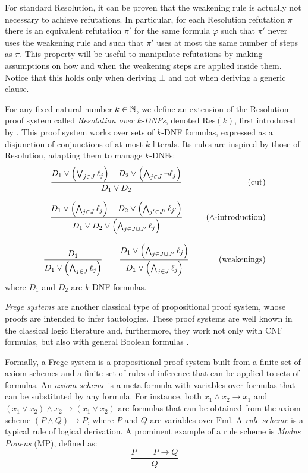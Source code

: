 For standard Resolution, it can be proven that the weakening rule is actually not necessary to achieve refutations. In particular, for each Resolution refutation $\pi$ there is an equivalent refutation $\pi'$ for the same formula $\varphi$ such that $\pi'$ never uses the weakening rule and such that $\pi'$ uses at most the same number of steps as $\pi$. This property will be useful to manipulate refutations by making assumptions on how and when the weakening steps are applied inside them. Notice that this holds only when deriving $\bot$ and not when deriving a generic clause.

For any fixed natural number $k \in \mathbb{N}$, we define an extension of the Resolution proof system called \textit{Resolution over $k$-DNFs}, denoted $\mathrm{Res}(k)$, first introduced by \textcite{resk}. This proof system works over sets of $k$-DNF formulas, expressed as a disjunction of conjunctions of at most $k$ literals. Its rules are inspired by those of Resolution, adapting them to manage $k$-DNFs:
\[\begin{array}{cr}
\dfrac{D_1 \lor \left ( \bigvee_{j \in J} \ell_j \right ) \quad D_2 \lor \left ( \bigwedge_{j \in J} \lnot \ell_j \right )}{D_1 \lor D_2} & \quad \text{(cut)} \\\\

\dfrac{D_1 \lor \left ( \bigwedge_{j \in J} \ell_j \right ) \quad D_2 \lor \left ( \bigwedge_{j' \in J'} \ell_{j'} \right )}{D_1 \lor D_2 \lor \left ( \bigwedge_{j \in J \cup J'} \ell_j \right )} &\quad \text{($\land$-introduction)} \\\\

\dfrac{D_1}{D_1 \lor \left ( \bigwedge_{j \in J} \ell_j \right )} \qquad \dfrac{D_1 \lor \left ( \bigwedge_{j \in J \cup J'} \ell_{j} \right )}{D_1 \lor \left ( \bigwedge_{j \in J} \ell_j \right )} &\quad \text{(weakenings)}
\end{array}\]
where $D_1$ and $D_2$ are $k$-DNF formulas.

\textit{Frege systems} are another classical type of propositional proof system, whose proofs are intended to infer tautologies. These proof systems are well known in the classical logic literature and, furthermore, they work not only with CNF formulas, but also with general Boolean formulas \cite{kraj_book,galesi_toran}.

Formally, a Frege system is a propositional proof system built from a finite set of axiom schemes and a finite set of rules of inference that can be applied to sets of formulas. An \textit{axiom scheme} is a meta-formula with variables over formulas that can be substituted by any formula. For instance, both $x_1 \land x_2 \to x_1$ and $(x_1 \lor x_2) \land x_2 \to (x_1 \lor x_2)$ are formulas that can be obtained from the axiom scheme $(P \land Q) \to P$, where $P$ and $Q$ are variables over $\mathrm{Fml}$. A \textit{rule scheme} is a typical rule of logical derivation. A prominent example of a rule scheme is \textit{Modus Ponens} (MP), defined as:
\begin{equation}
    \dfrac{P \qquad P \to Q}{Q}
\end{equation}

